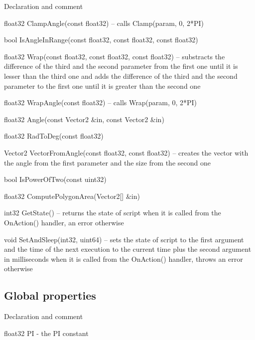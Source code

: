 \begin{titled-itemize}{Declaration and comment}
  \item float32 ClampAngle(const float32) -- calls Clamp(param, 0, 2*PI)
  \item bool IsAngleInRange(const float32, const float32, const float32)
  \item float32 Wrap(const float32, const float32, const float32) -- substracts the difference of the third and the second parameter from the first one until it is lesser than the third one and adds the difference of the third and the second parameter to the first one until it is greater than the second one
  \item float32 WrapAngle(const float32) -- calls Wrap(param, 0, 2*PI)
  \item float32 Angle(const Vector2 \&in, const Vector2 \&in)
  \item float32 RadToDeg(const float32)
  \item Vector2 VectorFromAngle(const float32, const float32) -- creates the vector with the angle from the first parameter and the size from the second one
  \item bool IsPowerOfTwo(const uint32)
  \item float32 ComputePolygonArea(Vector2[] \&in)
  \item int32 GetState() -- returns the state of script when it is called from the OnAction() handler, an error otherwise
  \item void SetAndSleep(int32, uint64) -- sets the state of script to the first argument and the time of the next execution to the current time plus the second argument in milliseconds when it is called from the OnAction() handler, throws an error otherwise
\end{titled-itemize}

\subsection{Global properties}

\begin{titled-itemize}{Declaration and comment}
  \item float32 PI - the PI constant
\end{titled-itemize}